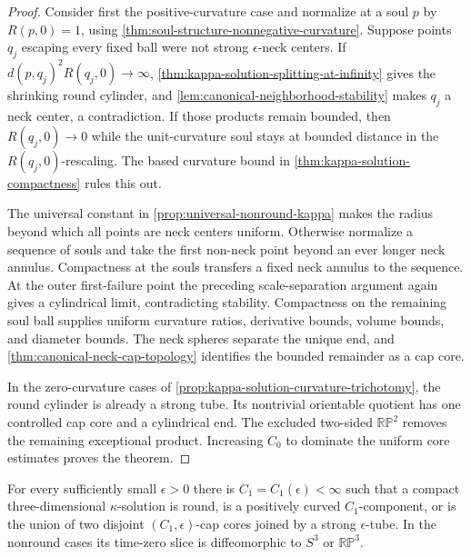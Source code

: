 \begin{proof}
Consider first the positive-curvature case and normalize at a soul $p$ by
$R(p,0)=1$, using \ref{thm:soul-structure-nonnegative-curvature}.  Suppose
points $q_j$ escaping every fixed ball were not strong
$\epsilon$-neck centers.  If
$d(p,q_j)^2R(q_j,0)\to\infty$,
\ref{thm:kappa-solution-splitting-at-infinity} gives the shrinking round
cylinder, and
\ref{lem:canonical-neighborhood-stability} makes $q_j$ a neck center, a
contradiction.  If those products remain bounded, then
$R(q_j,0)\to0$ while the unit-curvature soul stays at bounded distance in
the $R(q_j,0)$-rescaling.  The based curvature bound in
\ref{thm:kappa-solution-compactness} rules this out.

The universal constant in \ref{prop:universal-nonround-kappa} makes the
radius beyond which all points are neck centers uniform.  Otherwise
normalize a sequence of souls and take the first non-neck point beyond an
ever longer neck annulus.  Compactness at the souls transfers a fixed neck
annulus to the sequence.  At the outer first-failure point the preceding
scale-separation argument again gives a cylindrical limit, contradicting
stability.  Compactness on the remaining soul ball supplies uniform
curvature ratios, derivative bounds, volume bounds, and diameter bounds.
The neck spheres separate the unique end, and
\ref{thm:canonical-neck-cap-topology} identifies the bounded remainder as a
cap core.

In the zero-curvature cases of
\ref{prop:kappa-solution-curvature-trichotomy}, the round cylinder is already
a strong tube.  Its nontrivial orientable quotient has one controlled cap
core and a cylindrical end.  The excluded two-sided
$\mathbb{RP}^2$ removes the remaining exceptional product.  Increasing
$C_0$ to dominate the uniform core estimates proves the theorem.
\end{proof}

\begin{theorem}
\label{thm:compact-kappa-solution-structure}
\notready
For every sufficiently small $\epsilon>0$ there is
$C_1=C_1(\epsilon)<\infty$ such that a compact three-dimensional
$\kappa$-solution is round, is a positively curved $C_1$-component, or is
the union of two disjoint $(C_1,\epsilon)$-cap cores joined by a strong
$\epsilon$-tube.  In the nonround cases its time-zero slice is
diffeomorphic to $S^3$ or $\mathbb{RP}^3$.
\end{theorem}

